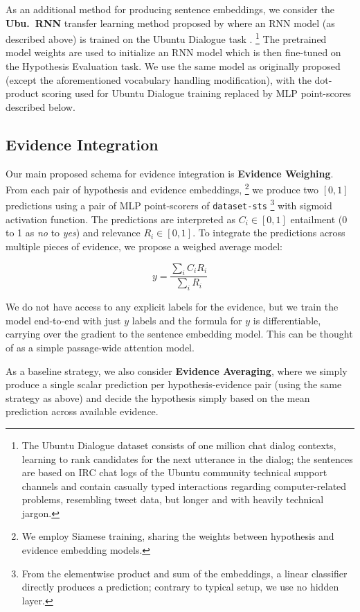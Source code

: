 \documentclass[11pt]{article}
\begin{document}
As an additional method for producing sentence embeddings, we consider
the \textbf{Ubu.\ RNN} transfer learning method proposed by \cite{sps} where an RNN model
(as described above) is trained on the Ubuntu Dialogue task \cite{UbuntuLowe}.%
\footnote{The Ubuntu Dialogue dataset consists of one million chat dialog contexts,
learning to rank candidates for the next utterance in the dialog;
the sentences are based on IRC chat logs of the Ubuntu
community technical support channels and contain casually typed interactions regarding
computer-related problems, resembling tweet data, but longer and with heavily technical jargon.}
The pretrained model weights are used to initialize an RNN model which is then fine-tuned
on the Hypothesis Evaluation task.  We use the same model as originally proposed (except the aforementioned vocabulary handling modification),
with the dot-product scoring used for Ubuntu Dialogue training replaced by MLP point-scores described below.

\subsection{Evidence Integration}

Our main proposed schema for evidence integration is \textbf{Evidence Weighing}.
From each pair of hypothesis and evidence embeddings,%
\footnote{We employ Siamese training, sharing the weights between hypothesis and evidence embedding models.}
we produce two $[0,1]$
predictions using a pair of MLP point-scorers of \texttt{dataset-sts} \cite{sps}%
\footnote{From the elementwise product
and sum of the embeddings, a linear classifier directly produces a prediction;
contrary to typical setup, we use no hidden layer.}
with sigmoid activation function.  The predictions are interpreted as $C_i \in [0,1]$
entailment (0 to 1 as \textit{no} to \textit{yes}) and relevance $R_i \in [0,1]$.
To integrate the predictions across multiple pieces of evidence,
we propose a weighed average model:

$$ y  = \frac{\sum_i C_iR_i}{\sum_i R_i} $$

We do not have access to any explicit labels for the evidence,
but we train the model end-to-end with just $y$ labels and the formula
for $y$ is differentiable, carrying over the gradient to the sentence
embedding model.
This can be thought of as a simple passage-wide attention model.

As a baseline strategy, we also consider \textbf{Evidence Averaging}, where
we simply produce a single scalar prediction per hypothesis-evidence pair
(using the same strategy as above) and decide the hypothesis simply based
on the mean prediction across available evidence.
\end{document}
